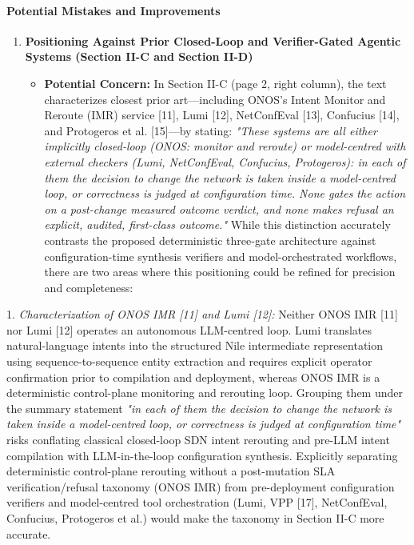 \documentclass[11pt,a4paper]{article}
\begin{document}
\paragraph{Potential Mistakes and Improvements}
\begin{enumerate}[leftmargin=1.6em,itemsep=3pt]
\item \textbf{Positioning Against Prior Closed-Loop and Verifier-Gated Agentic Systems (Section II-C and Section II-D)}
\begin{itemize}[leftmargin=1.8em,itemsep=2pt]
\item \textbf{Potential Concern:} In Section II-C (page 2, right column), the text characterizes closest prior art—including ONOS's Intent Monitor and Reroute (IMR) service [11], Lumi [12], NetConfEval [13], Confucius [14], and Protogeros et al. [15]—by stating: \emph{"These systems are all either implicitly closed-loop (ONOS: monitor and reroute) or model-centred with external checkers (Lumi, NetConfEval, Confucius, Protogeros): in each of them the decision to change the network is taken inside a model-centred loop, or correctness is judged at configuration time. None gates the action on a post-change measured outcome verdict, and none makes refusal an explicit, audited, first-class outcome."} While this distinction accurately contrasts the proposed deterministic three-gate architecture against configuration-time synthesis verifiers and model-orchestrated workflows, there are two areas where this positioning could be refined for precision and completeness:
\end{itemize}
\end{enumerate}
1. \emph{Characterization of ONOS IMR [11] and Lumi [12]:} Neither ONOS IMR [11] nor Lumi [12] operates an autonomous LLM-centred loop. Lumi translates natural-language intents into the structured Nile intermediate representation using sequence-to-sequence entity extraction and requires explicit operator confirmation prior to compilation and deployment, whereas ONOS IMR is a deterministic control-plane monitoring and rerouting loop. Grouping them under the summary statement \emph{"in each of them the decision to change the network is taken inside a model-centred loop, or correctness is judged at configuration time"} risks conflating classical closed-loop SDN intent rerouting and pre-LLM intent compilation with LLM-in-the-loop configuration synthesis. Explicitly separating deterministic control-plane rerouting without a post-mutation SLA verification/refusal taxonomy (ONOS IMR) from pre-deployment configuration verifiers and model-centred tool orchestration (Lumi, VPP [17], NetConfEval, Confucius, Protogeros et al.) would make the taxonomy in Section II-C more accurate.
\end{document}
